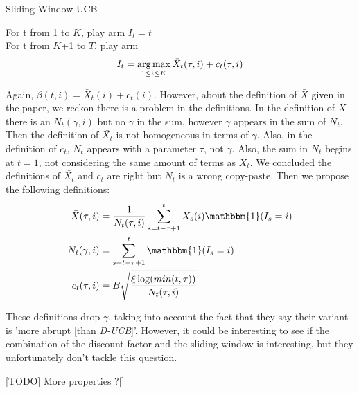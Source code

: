 \begin{algorithm}
    \caption{Sliding Window UCB}
    \label{alg:sw_ucb}
    For t from 1 to $K$, play arm $I_t = t$ \\
    For t from $K$+1 to $T$, play arm 
    $$ I_t = \operatorname*{arg\,max}_{1\leq i \leq K} \bar X_t(\tau,i) + c_t(\tau,i)$$
\end{algorithm}

Again, $\beta(t,i)=\bar{X}_t(i)+c_t(i)$.
However, about the definition of $\bar{X}$ given in the paper, we reckon there is a problem in the definitions. In the definition of $X$ there is an $N_t(\gamma, i)$ but no $\gamma$ in the sum, however $\gamma$ appears in the sum of $N_t$. Then the definition of $\bar{X_t}$ is not homogeneous in terms of $\gamma$. Also, in the definition of $c_t$, $N_t$ appears with a parameter $\tau$, not $\gamma$. Also, the sum in $N_t$ begins at $t=1$, not considering the same amount of terms as $X_t$. We concluded the definitions of $\bar{X_t}$ and $c_t$ are right but $N_t$ is a wrong copy-paste. Then we propose the following definitions:
\begin{align}
\bar{X}(\tau, i) &= \frac{1}{N_t(\tau, i)}\sum_{s=t-\tau+1}^t X_s(i)\mathbbm{1}(I_s=i) \\
N_t(\gamma, i) &= \sum_{s=t-\tau+1}^t \mathbbm{1}(I_s=i) \\
c_t(\tau, i) &= B\sqrt{\frac{\xi \log(min(t, \tau))}{N_t(\tau,i)}}
\end{align}

These definitions drop $\gamma$, taking into account the fact that they say their variant is 'more abrupt [than \textit{D-UCB}]'. However, it could be interesting to see if the combination of the discount factor and the sliding window is interesting, but they unfortunately don't tackle this question.

[TODO] More properties ?[]